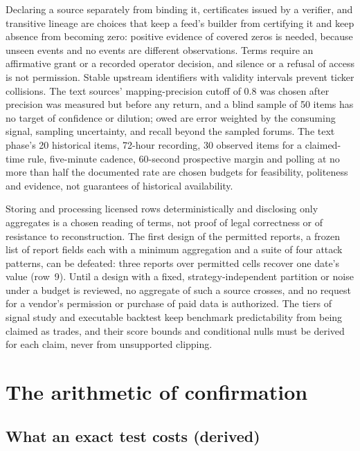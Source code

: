 \documentclass[11pt]{article}
\begin{document}
Declaring a source separately from binding it, certificates issued by a verifier, and transitive lineage are choices that keep a feed's builder from certifying it and keep absence from becoming zero: positive evidence of covered zeros is needed, because unseen events and no events are different observations. Terms require an affirmative grant or a recorded operator decision, and silence or a refusal of access is not permission. Stable upstream identifiers with validity intervals prevent ticker collisions. The text sources' mapping-precision cutoff of 0.8 was chosen after precision was measured but before any return, and a blind sample of 50 items has no target of confidence or dilution; owed are error weighted by the consuming signal, sampling uncertainty, and recall beyond the sampled forums. The text phase's 20 historical items, 72-hour recording, 30 observed items for a claimed-time rule, five-minute cadence, 60-second prospective margin and polling at no more than half the documented rate are chosen budgets for feasibility, politeness and evidence, not guarantees of historical availability.

Storing and processing licensed rows deterministically and disclosing only aggregates is a chosen reading of terms, not proof of legal correctness or of resistance to reconstruction. The first design of the permitted reports, a frozen list of report fields each with a minimum aggregation and a suite of four attack patterns, can be defeated: three reports over permitted cells recover one date's value (row~9). Until a design with a fixed, strategy-independent partition or noise under a budget is reviewed, no aggregate of such a source crosses, and no request for a vendor's permission or purchase of paid data is authorized. The tiers of signal study and executable backtest keep benchmark predictability from being claimed as trades, and their score bounds and conditional nulls must be derived for each claim, never from unsupported clipping.

\section{The arithmetic of confirmation}\label{app:confirm}

\subsection{What an exact test costs (derived)}\label{app:confirmer}
\end{document}
